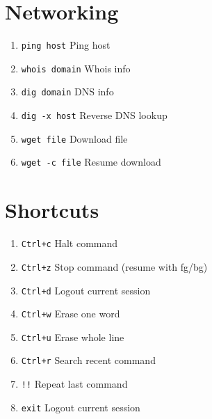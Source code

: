\documentclass[a4paper,12pt]{article}
\begin{document}
\newpage
\section{Networking}
\begin{enumerate}
  \item \texttt{ping host} \quad Ping host
  \item \texttt{whois domain} \quad Whois info
  \item \texttt{dig domain} \quad DNS info
  \item \texttt{dig -x host} \quad Reverse DNS lookup
  \item \texttt{wget file} \quad Download file
  \item \texttt{wget -c file} \quad Resume download
\end{enumerate}

\section{Shortcuts}
\begin{enumerate}
  \item \texttt{Ctrl+c} \quad Halt command
  \item \texttt{Ctrl+z} \quad Stop command (resume with fg/bg)
  \item \texttt{Ctrl+d} \quad Logout current session
  \item \texttt{Ctrl+w} \quad Erase one word
  \item \texttt{Ctrl+u} \quad Erase whole line
  \item \texttt{Ctrl+r} \quad Search recent command
  \item \texttt{!!} \quad Repeat last command
  \item \texttt{exit} \quad Logout current session
\end{enumerate}
\end{document}
